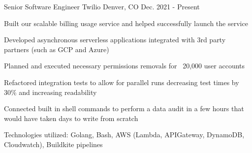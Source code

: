 


\begin{cventries}

\vspace{-.25em}
\cventry
{Senior Software Engineer} %
{Twilio} %
{Denver, CO} %
{Dec. 2021 - Present} %
{ %
\begin{cvitems}
    \item {Built our scalable billing usage service and helped successfully launch the service}
    \item {Developed asynchronous serverless applications integrated with 3rd party partners (such as GCP and Azure)}
    \item {Planned and executed necessary permissions removals for ~20,000 user accounts}
    \item {Refactored integration tests to allow for parallel runs decreasing test times by 30\% and increasing readability}
    \item {Connected built in shell commands to perform a data audit in a few hours that would have taken days to write from scratch}
    \item {Technologies utilized: Golang, Bash, AWS (Lambda, APIGateway, DynamoDB, Cloudwatch), Buildkite pipelines}
\end{cvitems}
}


\end{cventries}
